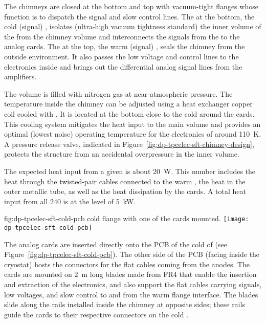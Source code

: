 The chimneys are closed at the bottom and top with vacuum-tight \fdth flanges whose function is to dispatch the signal and slow control lines. The \fdth at the bottom, the cold (signal) \fdth, isolates (ultra-high vacuum tightness standard) the inner volume of the  from the chimney volume and interconnects the signals from the  to the analog  cards. The \fdth at the top, the warm (signal) \fdth, seals the chimney from the outside environment. It also passes the low voltage and control lines to the  electronics inside and brings out the differential analog signal lines from the  amplifiers. 

The  volume is filled with nitrogen gas at near-atmospheric pressure. The temperature inside the chimney can be adjusted using a heat exchanger copper coil cooled with \lar. It is located at the bottom close to the cold \fdth around the  cards. This cooling system mitigates the heat input to the main  volume and provides an optimal (lowest noise) operating temperature for the  electronics of around \SI{110}{K}. A pressure release valve, indicated in Figure~\ref{fig:dp-tpcelec-sft-chimney-design}, protects the structure from an accidental overpressure in the inner volume. 

The expected heat input from a given  is about \SI{20}{\watt}. This number includes the heat through the twisted-pair cables connected to the warm \fdth, the heat in the   outer metallic tube, as well as the heat dissipation by the  cards. A total heat input from all \num{240}  is at the level of \SI{5}{\kilo\watt}. 

\begin{dunefigure}{fig:dp-tpcelec-sft-cold-pcb}
{ cold \fdth flange with one of the  cards mounted.}
\texttt{[image: dp-tpcelec-sft-cold-pcb]}
\end{dunefigure}

The analog  cards are inserted directly onto the PCB of the cold \fdth of  (see Figure~\ref{fig:dp-tpcelec-sft-cold-pcb}). The other side of the PCB (facing inside the cryostat) hosts the connectors for the flat cables coming from the  anodes.  The  cards are mounted on \SI{2}{\m} long blades made from FR4 that enable the insertion and extraction of the electronics, and also support the flat cables carrying signals, low voltages, and slow control to and from the warm flange interface.  The blades slide along the rails installed inside the chimney at opposite sides; these rails guide the  cards to their respective connectors on the cold \fdth. 

